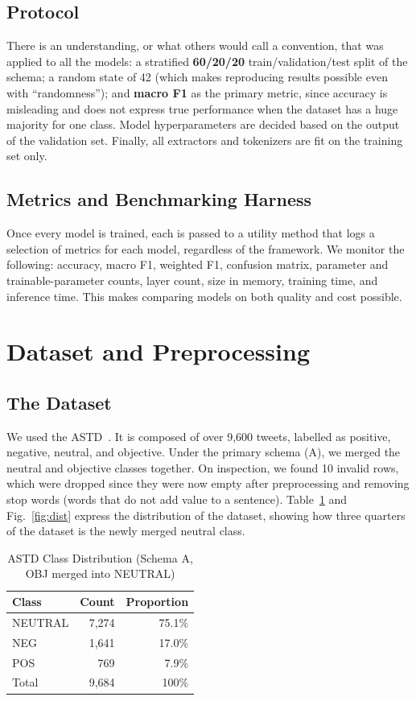 \documentclass[conference]{IEEEtran}
\begin{document}
\subsection{Protocol}
There is an understanding, or what others would call a convention, that was applied to all the models:
a stratified \textbf{60/20/20} train/validation/test split of the schema; a random state of 42
(which makes reproducing results possible even with ``randomness''); and \textbf{macro F1} as the primary
metric, since accuracy is misleading and does not express true performance when the dataset has a huge
majority for one class. Model hyperparameters are decided based on the output of the validation set. Finally,
all extractors and tokenizers are fit on the training set only.

\subsection{Metrics and Benchmarking Harness}
Once every model is trained, each is passed to a utility method that logs a selection
of metrics for each model, regardless of the framework. We monitor the following: accuracy, macro F1,
weighted F1, confusion matrix, parameter and trainable-parameter counts, layer count, size in memory,
training time, and inference time. This makes comparing models on both quality and cost possible.


\section{Dataset and Preprocessing}

\subsection{The Dataset}
We used the ASTD~\cite{nabil2015astd}. It is composed of over 9,600 tweets,
labelled as positive, negative, neutral, and objective. Under the primary schema (A), we merged
the neutral and objective classes together. On inspection, we found 10 invalid rows, which were
dropped since they were now empty after preprocessing and removing stop words (words that do
not add value to a sentence). Table~\ref{tab:dist} and Fig.~\ref{fig:dist} express the
distribution of the dataset, showing how three quarters of the dataset is the newly merged
neutral class.

\begin{table}[h]
  \centering
  \caption{ASTD Class Distribution (Schema A, OBJ merged into NEUTRAL)}
  \label{tab:dist}
  \begin{tabular}{lrr}
    \toprule
    Class   & Count & Proportion \\
    \midrule
    NEUTRAL & 7,274 & 75.1\%     \\
    NEG     & 1,641 & 17.0\%     \\
    POS     &   769 &  7.9\%     \\
    \midrule
    Total   & 9,684 & 100\%      \\
    \bottomrule
  \end{tabular}
\end{table}
\end{document}
